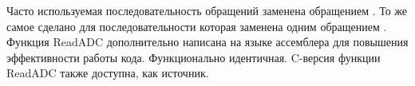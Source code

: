 Часто используемая последовательность обращений  заменена обращением
.
То же самое сделано для последовательности  которая  заменена одним обращением
.\\

Функция ReadADC  дополнительно написана на языке ассемблера для повышения эффективности работы кода. Функционально 
идентичная. C-версия функции ReadADC также доступна, как источник.
